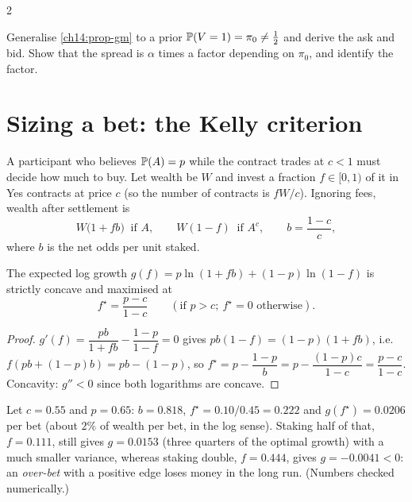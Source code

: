 \begin{paracol}{2}
\begin{exercise}\label{ch14:ex-gm}
Generalise \cref{ch14:prop-gm} to a prior $\mathbb{P}(V=1)=\pi_0\neq\tfrac12$ and derive the ask and bid. Show that the spread
is $\alpha$ times a factor depending on $\pi_0$, and identify the factor.
\end{exercise}

\section{Sizing a bet: the Kelly criterion}\label{ch14:sec-kelly}

A participant who believes $\mathbb{P}(A)=p$ while the contract trades at $c<1$ must decide how much to buy. Let wealth be $W$ and
invest a fraction $f\in[0,1)$ of it in Yes contracts at price $c$ (so the number of contracts is $fW/c$). Ignoring fees, wealth after
settlement is
\[
  W\bigl(1+fb\bigr)\ \text{ if }A,\qquad W(1-f)\ \text{ if }A^c,\qquad b=\frac{1-c}{c},
\]
where $b$ is the net odds per unit staked.

\begin{proposition}\label{ch14:prop-kelly}
The expected log growth $g(f)=p\ln(1+fb)+(1-p)\ln(1-f)$ is strictly concave and maximised at
\[
  f^\star=\frac{p-c}{1-c}\qquad(\text{if }p>c;\ f^\star=0\text{ otherwise}).
\]
\end{proposition}
\begin{proof}
$g'(f)=\dfrac{pb}{1+fb}-\dfrac{1-p}{1-f}=0$ gives $pb(1-f)=(1-p)(1+fb)$, i.e.\ $f(pb+(1-p)b)=pb-(1-p)$, so
$f^\star=p-\dfrac{1-p}{b}=p-\dfrac{(1-p)c}{1-c}=\dfrac{p-c}{1-c}$. Concavity: $g''<0$ since both logarithms are concave.
\end{proof}

\begin{example}\label{ch14:ex-kelly}
Let $c=0.55$ and $p=0.65$: $b=0.818$, $f^\star=0.10/0.45=0.222$ and $g(f^\star)=0.0206$ per bet (about $2\%$ of wealth per bet, in
the log sense). Staking half of that, $f=0.111$, still gives $g=0.0153$ (three quarters of the optimal growth) with a much smaller
variance, whereas staking double, $f=0.444$, gives $g=-0.0041<0$: an \emph{over-bet} with a positive edge loses money in the long run.
(Numbers checked numerically.)
\end{example}


\end{paracol}
